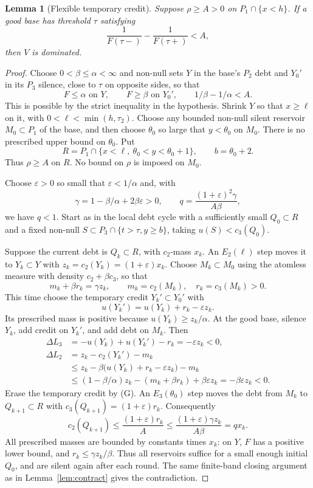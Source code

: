 \documentclass[11pt]{article}
\newtheorem{lemma}[theorem]{Lemma}
\theoremstyle{remark}\newtheorem{remark}[theorem]{Remark}
\begin{document}
\begin{lemma}[Flexible temporary credit]\label{lem:flexible}
Suppose $\rho\ge A>0$ on $P_1\cap\{x<h\}$. If a good base has threshold
$\tau$ satisfying
\[
 \frac1{F(\tau-)}-\frac1{F(\tau+)}<A,
 \tag{*}\label{eq:contraction}
\]
then $V$ is dominated.
\end{lemma}
\begin{proof}
Choose $0<\beta\le\alpha<\infty$ and non-null sets $Y$ in the base's
$P_2$ debt and $Y_0'$ in its $P_3$ silence, close to $\tau$ on opposite
sides, so that
\[
 F\le\alpha\text{ on }Y,\qquad F\ge\beta\text{ on }Y_0',\qquad
 1/\beta-1/\alpha<A.
\]
This is possible by the strict inequality in the hypothesis. Shrink $Y$
so that $x\ge\ell$ on it, with $0<\ell<\min(h,\tau_2)$.
Choose any bounded non-null silent reservoir $M_0\subset P_1$ of the base,
and then choose $\theta_0$ so large that $y<\theta_0$ on $M_0$.
There is no prescribed upper bound on $\theta_0$. Put
\[
 R=P_1\cap\{x<\ell,\ \theta_0<y<\theta_0+1\},\qquad b=\theta_0+2.
\]
Thus $\rho\ge A$ on $R$. No bound on $\rho$ is imposed on $M_0$.

Choose $\varepsilon>0$ so small that $\varepsilon<1/\alpha$ and, with
\[
 \gamma=1-\beta/\alpha+2\beta\varepsilon>0,\qquad
 q=\frac{(1+\varepsilon)^2\gamma}{A\beta},
\]
we have $q<1$. Start as in the local debt cycle with a sufficiently small
$Q_0\subset R$ and a fixed non-null
$S\subset P_3\cap\{t>\tau,y\ge b\}$, taking $u(S)<c_3(Q_0)$.

Suppose the current debt is $Q_k\subset R$, with $c_2$-mass $x_k$.
An $E_2(\ell)$ step moves it to $Y_k\subset Y$ with
$z_k=c_2(Y_k)=(1+\varepsilon)x_k$. Choose $M_k\subset M_0$ using the
atomless measure with density $c_2+\beta c_3$, so that
\[
 m_k+\beta r_k=\gamma z_k,\qquad
 m_k=c_2(M_k),\quad r_k=c_3(M_k)>0.
\]
This time choose the temporary credit $Y_k'\subset Y_0'$ with
\[
 u(Y_k')=u(Y_k)+r_k-\varepsilon z_k.
\]
Its prescribed mass is positive because $u(Y_k)\ge z_k/\alpha$.
At the good base, silence $Y_k$, add credit on $Y_k'$, and add debt on
$M_k$. Then
\begin{align*}
 \Delta L_3&=-u(Y_k)+u(Y_k')-r_k=-\varepsilon z_k<0,\\
 \Delta L_2&=z_k-c_2(Y_k')-m_k\\
 &\le z_k-\beta\bigl(u(Y_k)+r_k-\varepsilon z_k\bigr)-m_k\\
 &\le (1-\beta/\alpha)z_k-(m_k+\beta r_k)+\beta\varepsilon z_k
   =-\beta\varepsilon z_k<0.
\end{align*}
Erase the temporary credit by (G). An $E_3(\theta_0)$ step moves the debt
from $M_k$ to $Q_{k+1}\subset R$ with
$c_3(Q_{k+1})=(1+\varepsilon)r_k$. Consequently
\[
 c_2(Q_{k+1})\le\frac{(1+\varepsilon)r_k}{A}
 \le\frac{(1+\varepsilon)\gamma z_k}{A\beta}=q x_k.
\]
All prescribed masses are bounded by constants times $x_k$: on $Y$,
$F$ has a positive lower bound, and $r_k\le\gamma z_k/\beta$.
Thus all reservoirs suffice for a small enough initial $Q_0$, and are
silent again after each round. The same finite-band closing argument as
in Lemma~\ref{lem:contract} gives the contradiction.
\end{proof}
\end{document}

